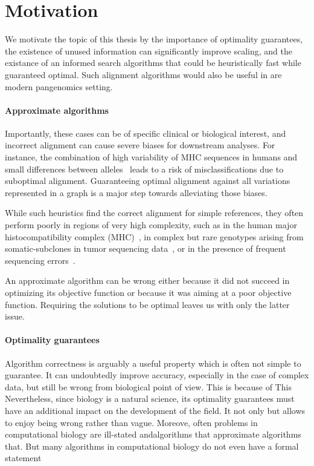 \section*{Motivation}

We motivate the topic of this thesis by the importance of optimality guarantees,
the existence of unused information can significantly improve scaling, and the
existance of an informed search algorithms that could be heuristically fast
while guaranteed optimal. Such alignment algorithms would also be useful in are
modern pangenomics setting.

\paragraph{Approximate algorithms}

Importantly, these cases can be of specific clinical or biological interest, and
incorrect alignment can cause severe biases for downstream analyses. For
instance, the combination of high variability of MHC sequences in humans and
small differences between alleles~\cite{buhler_hla_2011} leads to a risk of
misclassifications due to suboptimal alignment. Guaranteeing optimal alignment
against all variations represented in a graph is a major step towards
alleviating those biases.

While such heuristics find the correct alignment for simple references, they
often perform poorly in regions of very high complexity, such as in the human
major histocompatibility complex (MHC)~\cite{dilthey_improved_2015}, in complex
but rare genotypes arising from somatic-subclones in tumor sequencing
data~\cite{harismendy_detection_2011}, or in the presence of frequent sequencing
errors~\cite{salmela_lordec_2014}.

An approximate algorithm can be wrong either because it did not succeed in
optimizing its objective function or because it was aiming at a poor objective
function. Requiring the solutions to be optimal leaves us with only the latter
issue.

\paragraph{Optimality guarantees}

Algorithm correctness is arguably a useful property which is often not simple to
guarantee. It can undoubtedly improve accuracy, especially in the case of
complex data, but still be wrong from biological point of view. This is because
of  This Nevertheless, since biology is a natural science, its  optimality
guarantees must have an additional impact on the development of the field. It
not only but allows to enjoy being wrong rather than vague. Moreove, often
problems in computational biology are ill-stated andalgorithms that approximate
algorithms that. But many algorithms in computational biology do not even have a
formal statement 


